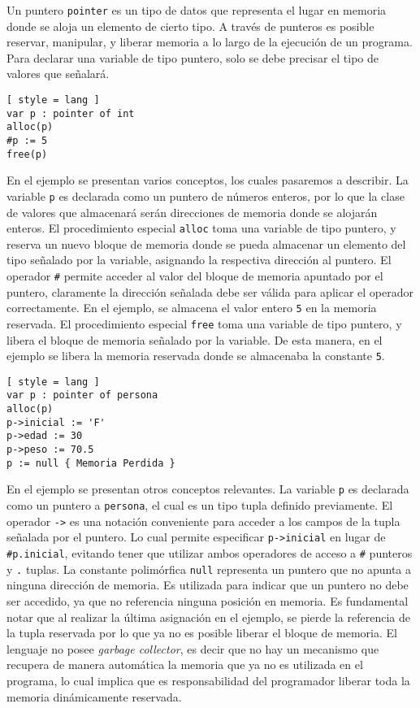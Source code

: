 Un puntero \lstinline[style = lang]{pointer} es un tipo de datos que representa el lugar en memoria donde se aloja un elemento de cierto tipo.
A través de punteros es posible reservar, manipular, y liberar memoria a lo largo de la ejecución de un programa.
Para declarar una variable de tipo puntero, solo se debe precisar el tipo de valores que señalará.

\begin{lstlisting}[ style = lang ]
var p : pointer of int
alloc(p)
#p := 5
free(p)
\end{lstlisting}

En el ejemplo se presentan varios conceptos, los cuales pasaremos a describir.
La variable \lstinline[style = lang]{p} es declarada como un puntero de números enteros, por lo que la clase de valores que almacenará serán direcciones de memoria donde se alojarán enteros.
El procedimiento especial \lstinline[style = lang]{alloc} toma una variable de tipo puntero, y reserva un nuevo bloque de memoria donde se pueda almacenar un elemento del tipo señalado por la variable, asignando la respectiva dirección al puntero.
El operador \lstinline[style = lang]{#} permite acceder al valor del bloque de memoria apuntado por el puntero, claramente la dirección señalada debe ser válida para aplicar el operador correctamente.
En el ejemplo, se almacena el valor entero \lstinline[style = lang]{5} en la memoria reservada.
El procedimiento especial \lstinline[style = lang]{free} toma una variable de tipo puntero, y libera el bloque de memoria señalado por la variable.
De esta manera, en el ejemplo se libera la memoria reservada donde se almacenaba la constante \lstinline[style = lang]{5}.

\begin{lstlisting}[ style = lang ]
var p : pointer of persona
alloc(p)
p->inicial := 'F'
p->edad := 30
p->peso := 70.5
p := null { Memoria Perdida }
\end{lstlisting}

En el ejemplo se presentan otros conceptos relevantes.
La variable \lstinline[style = lang]{p} es declarada como un puntero a \lstinline[style = lang]{persona}, el cual es un tipo tupla definido previamente.
El operador \lstinline[style = lang]{->} es una notación conveniente para acceder a los campos de la tupla señalada por el puntero.
Lo cual permite especificar \lstinline[style = lang]{p->inicial} en lugar de \lstinline[style = lang]{#p.inicial}, evitando tener que utilizar ambos operadores de acceso a \lstinline[style = lang]{#} punteros y \lstinline[style = lang]{.} tuplas.
La constante polimórfica \lstinline[style = lang]{null} representa un puntero que no apunta a ninguna dirección de memoria.
Es utilizada para indicar que un puntero no debe ser accedido, ya que no referencia ninguna posición en memoria.
Es fundamental notar que al realizar la última asignación en el ejemplo, se pierde la referencia de la tupla reservada por lo que ya no es posible liberar el bloque de memoria.
El lenguaje no posee \textit{garbage collector}, es decir que no hay un mecanismo que recupera de manera automática la memoria que ya no es utilizada en el programa, lo cual implica que es responsabilidad del programador liberar toda la memoria dinámicamente reservada.


